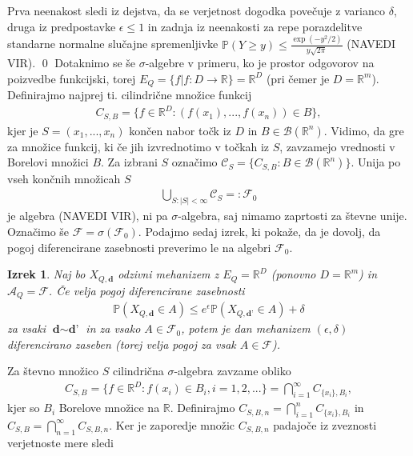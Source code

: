 \documentclass[12pt,a4paper]{amsart}
\theoremstyle{definition} %
\theoremstyle{plain} %
\newtheorem{izrek}[definicija]{Izrek}
\begin{document}
Prva neenakost sledi iz dejstva, da se verjetnost dogodka povečuje z varianco $\delta$, druga iz predpostavke $\epsilon \leq 1$ in zadnja iz neenakosti za repe porazdelitve standarne normalne slučajne spremenljivke $\mathbb{P}(Y \geq y) \leq \frac{\exp(-y^2 / 2)}{y \sqrt{2\pi}}$ (NAVEDI VIR).
\qed
\newline
\newline
Dotaknimo se še $\sigma$-algebre v primeru, ko je prostor odgovorov na poizvedbe funkcijski, torej $E_Q = \{f | f : D \rightarrow \mathbb{R}\} = \mathbb{R}^D$ (pri čemer je $D=\mathbb{R}^m$). Definirajmo najprej ti. cilindrične množice funkcij 
\begin{gather*}
C_{S,B} = \{ f \in \mathbb{R}^D : (f(x_1), ..., f(x_n)) \in B \},
\end{gather*}
kjer je $S = (x_1,...,x_n)$ končen nabor točk iz $D$ in $B \in \mathcal{B}(\mathbb{R}^n)$. Vidimo, da gre za množice funkcij, ki če jih izvrednotimo v točkah iz $S$, zavzamejo vrednosti v Borelovi množici $B$. Za izbrani $S$ označimo $\mathcal{C}_S = \{ C_{S,B} : B \in \mathcal{B}(\mathbb{R}^n) \}$. Unija po vseh končnih množicah $S$
\begin{gather*}
\bigcup_{S : |S| < \infty} \mathcal{C}_S =: \mathcal{F}_0
\end{gather*}
je algebra (NAVEDI VIR), ni pa $\sigma$-algebra, saj nimamo zaprtosti za števne unije. Označimo še $\mathcal{F} = \sigma(\mathcal{F}_0)$. Podajmo sedaj izrek, ki pokaže, da je dovolj, da pogoj diferencirane zasebnosti preverimo le na algebri $\mathcal{F}_0$. 
\begin{izrek}
Naj bo $X_{Q,\textbf{d}}$ odzivni mehanizem z $E_Q = \mathbb{R}^D$ (ponovno $D = \mathbb{R}^m$) in $\mathcal{A}_Q = \mathcal{F}$. Če velja pogoj diferencirane zasebnosti 
\begin{gather*}
\mathbb{P}(X_{Q,\textbf{d}} \in A) \leq e^\epsilon \mathbb{P}(X_{Q,\textbf{d'}} \in A) + \delta
\end{gather*}
za vsaki $\textbf{d} \sim \textbf{d'}$ in za vsako $A \in \mathcal{F}_0$, potem je dan mehanizem $(\epsilon, \delta)$ diferencirano zaseben (torej velja pogoj za vsak $A \in \mathcal{F}$).
\end{izrek}
\proof Za števno množico $S$ cilindrična $\sigma$-algebra zavzame obliko
\begin{gather*}
C_{S,B} = \{ f \in \mathbb{R}^D : f(x_i) \in B_i, i = 1,2,... \} = \bigcap_{i=1}^{\infty}C_{\{x_i\},B_i},
\end{gather*}
kjer so $B_i$ Borelove množice na $\mathbb{R}$. Definirajmo $C_{S,B,n} = \bigcap_{i=1}^{n}C_{\{x_i\},B_i}$ in $C_{S,B} = \bigcap_{n=1}^{\infty}C_{S,B,n}$. Ker je zaporedje množic $C_{S,B,n}$ padajoče iz zveznosti verjetnoste mere sledi
\end{document}
